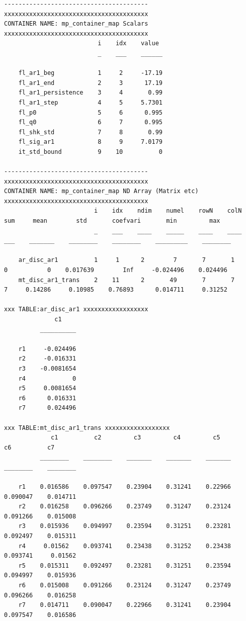 \documentclass[
]{book}
\begin{document}
\begin{verbatim}
----------------------------------------
xxxxxxxxxxxxxxxxxxxxxxxxxxxxxxxxxxxxxxxx
CONTAINER NAME: mp_container_map Scalars
xxxxxxxxxxxxxxxxxxxxxxxxxxxxxxxxxxxxxxxx
                          i    idx    value 
                          _    ___    ______

    fl_ar1_beg            1     2     -17.19
    fl_ar1_end            2     3      17.19
    fl_ar1_persistence    3     4       0.99
    fl_ar1_step           4     5     5.7301
    fl_p0                 5     6      0.995
    fl_q0                 6     7      0.995
    fl_shk_std            7     8       0.99
    fl_sig_ar1            8     9     7.0179
    it_std_bound          9    10          0

----------------------------------------
xxxxxxxxxxxxxxxxxxxxxxxxxxxxxxxxxxxxxxxx
CONTAINER NAME: mp_container_map ND Array (Matrix etc)
xxxxxxxxxxxxxxxxxxxxxxxxxxxxxxxxxxxxxxxx
                         i    idx    ndim    numel    rowN    colN    sum     mean        std       coefvari       min         max   
                         _    ___    ____    _____    ____    ____    ___    _______    ________    ________    _________    ________

    ar_disc_ar1          1     1      2        7       7       1       0           0    0.017639        Inf     -0.024496    0.024496
    mt_disc_ar1_trans    2    11      2       49       7       7       7     0.14286     0.10985    0.76893      0.014711     0.31252

xxx TABLE:ar_disc_ar1 xxxxxxxxxxxxxxxxxx
              c1    
          __________

    r1     -0.024496
    r2     -0.016331
    r3    -0.0081654
    r4             0
    r5     0.0081654
    r6      0.016331
    r7      0.024496

xxx TABLE:mt_disc_ar1_trans xxxxxxxxxxxxxxxxxx
             c1          c2         c3         c4         c5          c6          c7   
          ________    ________    _______    _______    _______    ________    ________

    r1    0.016586    0.097547    0.23904    0.31241    0.22966    0.090047    0.014711
    r2    0.016258    0.096266    0.23749    0.31247    0.23124    0.091266    0.015008
    r3    0.015936    0.094997    0.23594    0.31251    0.23281    0.092497    0.015311
    r4     0.01562    0.093741    0.23438    0.31252    0.23438    0.093741     0.01562
    r5    0.015311    0.092497    0.23281    0.31251    0.23594    0.094997    0.015936
    r6    0.015008    0.091266    0.23124    0.31247    0.23749    0.096266    0.016258
    r7    0.014711    0.090047    0.22966    0.31241    0.23904    0.097547    0.016586


\end{verbatim}
\end{document}
